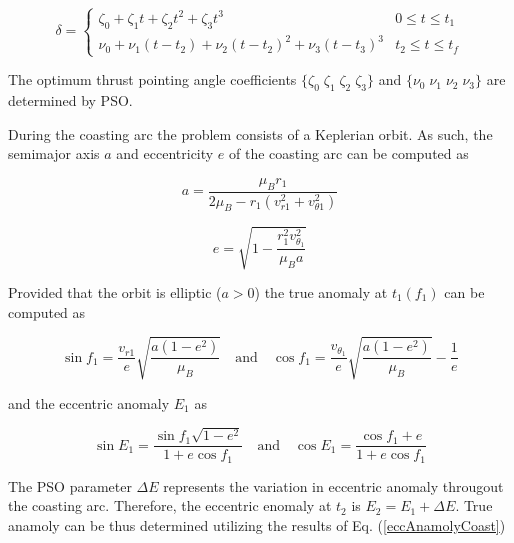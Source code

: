 \begin{equation}
    \delta = 
    \begin{cases}
        \zeta_0 +\zeta_1t+\zeta_2t^2 +\zeta_3t^3 & 0 \leq t \leq t_1 \\
        \nu_0 + \nu_1(t-t_2) + \nu_2(t-t_2)^2+\nu_3(t-t_3)^3 & t_2 \leq t \leq t_f
    \end{cases}
    \label{delta_eq}
\end{equation} \linebreak

\noindent The optimum thrust pointing angle coefficients $\{\zeta_0 \; \zeta_1 \; \zeta_2 \; \zeta_3 \}$
and $\{\nu_0 \; \nu_1 \; \nu_2 \; \nu_3\}$ are determined by PSO. \newline

During the coasting arc the problem consists of a Keplerian orbit. As such, the semimajor axis $a$ and eccentricity $e$ of the coasting arc can be computed as

\begin{equation}
a = \dfrac{\mu_Br_1}{2\mu_B - r_1(v_{r1}^2+v_{\theta1}^2)}
\label{acoast}
\end{equation}

\begin{equation}
e = \sqrt{1-\dfrac{r_1^2v_{\theta_1}^2}{\mu_Ba}}
\label{ecoast}
\end{equation} \newline

\noindent Provided that the orbit is elliptic ($a > 0$) the true anomaly at $t_1(f_1)$ can be computed as

\begin{equation}
\sin f_1 = \dfrac{v_{r1}}{e}\sqrt{\dfrac{a(1-e^2)}{\mu_B}} \quad \text{and} \quad \cos{f_1} = \dfrac{v_{\theta_1}}{e}\sqrt{\dfrac{a(1-e^2)}{\mu_B}}-\dfrac{1}{e}
\label{trueAnamolyCoast}
\end{equation} \newline

\noindent and the eccentric anomaly $E_1$ as 

\begin{equation}
\sin{E_1} = \dfrac{\sin{f_1}\sqrt{1-e^2}}{1+e\cos{f_1}} \quad \text{and} \quad 
\cos{E_1} = \dfrac{\cos{f_1}+e}{1+e\cos{f_1}}
\label{eccAnamolyCoast}
\end{equation}

\noindent The PSO parameter $\Delta E$ represents the variation in eccentric anomaly througout the coasting arc. Therefore, the eccentric enomaly at $t_2$ is $E_2 = E_1 + \Delta E$. True anamoly can be
thus determined utilizing the results of Eq. (\ref{eccAnamolyCoast})

